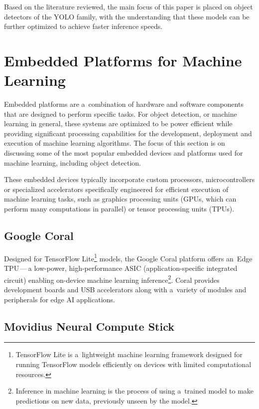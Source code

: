 Based on the literature reviewed, the main focus of this paper is placed on
object detectors of the YOLO family, with the understanding that these models
can be further optimized to achieve faster inference speeds.






\section{Embedded Platforms for Machine Learning}
\label{EmbeddedPlatforms}

Embedded platforms are a~combination of hardware and software components that
are designed to perform specific tasks. For object detection, or machine
learning in general, these systems are optimized to be power efficient while
providing significant processing capabilities for the development, deployment
and execution of machine learning algorithms. The focus of this section is on
discussing some of the most popular embedded devices and platforms used for
machine learning, including object detection.

These embedded devices typically incorporate custom processors, microcontrollers
or specialized accelerators specifically engineered for efficient execution of
machine learning tasks, such as graphics processing units (GPUs, which can
perform many computations in parallel) or tensor processing units (TPUs).

\subsection{Google Coral}

Designed for TensorFlow Lite\footnote{TensorFlow Lite is a~lightweight machine
learning framework designed for running TensorFlow models efficiently on devices
with limited computational resources.} models, the Google Coral platform offers
an~Edge TPU\,---\,a low-power, high-performance ASIC (application-specific
integrated circuit) enabling on-device machine learning
inference\footnote{Inference in machine learning is the process of using
a~trained model to make predictions on new data, previously unseen by the model.}.
Coral provides development boards and USB accelerators along with a~variety of
modules and peripherals for edge AI applications.


\subsection{Movidius Neural Compute Stick}

